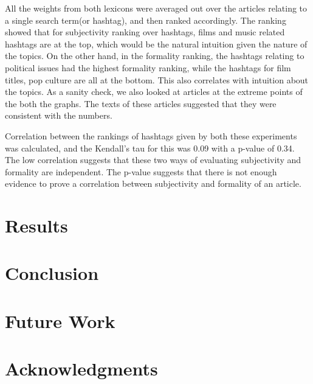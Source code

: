 \documentclass[11pt]{article}
\begin{document}
All the weights from both lexicons were averaged out over the articles relating to a single search term(or hashtag), and then ranked accordingly. The ranking showed that for subjectivity ranking over hashtags, films and music related hashtags are at the top, which would be the natural intuition given the nature of the topics. On the other hand, in the formality ranking, the hashtags relating to political issues had the highest formality ranking, while the hashtags for film titles, pop culture are all at the bottom. This also correlates with intuition about the topics. As a sanity check, we also looked at articles at the extreme points of the both the graphs. The texts of these articles suggested that they were consistent with the numbers.

Correlation between the rankings of hashtags given by both these experiments was calculated, and the Kendall’s tau for this was 0.09 with a p-value of 0.34. The low correlation suggests that these two ways of evaluating subjectivity and formality are independent. The p-value suggests that there is not enough evidence to prove a correlation between subjectivity and formality of an article.


\section{Results}


\section{Conclusion}

\section{Future Work}

\section*{Acknowledgments}



\end{document}
